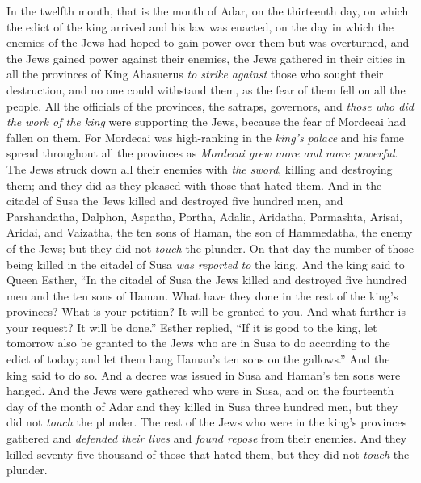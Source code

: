 \begin{biblechapter} %
 In the twelfth month, that is the month of Adar, on the thirteenth day, on which the edict of the king arrived and his law was enacted, on the day in which the enemies of the Jews had hoped to gain power over them but was overturned, and the Jews gained power against their enemies,
\verse the Jews gathered in their cities in all the provinces of King Ahasuerus \textit{to strike against} those who sought their destruction, and no one could withstand them, as the fear of them fell on all the people.
\verse All the officials of the provinces, the satraps, governors, and \textit{those who did the work of the king} were supporting the Jews, because the fear of Mordecai had fallen on them.
\verse For Mordecai was high-ranking in the \textit{king’s palace} and his fame spread throughout all the provinces as \textit{Mordecai grew more and more powerful}.
\verse The Jews struck down all their enemies with \textit{the sword}, killing and destroying them; and they did as they pleased with those that hated them.
\verse And in the citadel of Susa the Jews killed and destroyed five hundred men,
\verse and Parshandatha, Dalphon, Aspatha,
\verse Portha, Adalia, Aridatha,
\verse Parmashta, Arisai, Aridai, and Vaizatha,
\verse the ten sons of Haman, the son of Hammedatha, the enemy of the Jews; but they did not \textit{touch} the plunder.
\verse On that day the number of those being killed in the citadel of Susa \textit{was reported to} the king.
\verse And the king said to Queen Esther, “In the citadel of Susa the Jews killed and destroyed five hundred men and the ten sons of Haman. What have they done in the rest of the king’s provinces? What is your petition? It will be granted to you. And what further is your request? It will be done.”
\verse Esther replied, “If it is good to the king, let tomorrow also be granted to the Jews who are in Susa to do according to the edict of today; and let them hang Haman’s ten sons on the gallows.”
\verse And the king said to do so. And a decree was issued in Susa and Haman’s ten sons were hanged.
\verse And the Jews were gathered who were in Susa, and on the fourteenth day of the month of Adar and they killed in Susa three hundred men, but they did not \textit{touch} the plunder.
\verse The rest of the Jews who were in the king’s provinces gathered and \textit{defended their lives} and \textit{found repose} from their enemies. And they killed seventy-five thousand of those that hated them, but they did not \textit{touch} the plunder.

\end{biblechapter}
